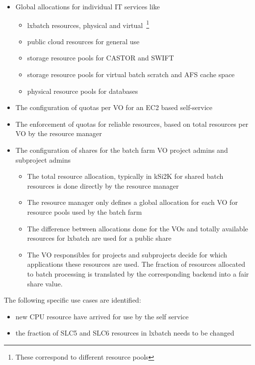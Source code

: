 \begin{itemize}
\item Global allocations for individual IT services like 
\begin{itemize}
\item lxbatch resources, physical and virtual~\footnote{These correspond to different resource pools} 
\item public cloud resources for general use
\item storage resource pools for CASTOR and SWIFT
\item storage resource pools for virtual batch scratch and AFS cache space
\item physical resource pools for databases
\end{itemize}
\item The configuration of quotas per VO for an EC2 based self-service
\item The enforcement of quotas for reliable resources, based on total resources per VO by the resource manager
\item The configuration of shares for the batch farm VO project admins and subproject admins
\begin{itemize}
 \item The total resource allocation, typically in kSi2K for shared batch resources is done directly by the resource manager 
 \item The resource manager only defines a global allocation for each VO for resource pools used by the batch farm
 \item The difference between allocations done for the VOs and totally available resources for lxbatch are used for a public share
 \item The VO responsibles for projects and subprojects decide for which applications these resources are used. The fraction of resources allocated to batch processing is translated by the corresponding backend into a fair share value.
\end{itemize}
\end{itemize}

The following specific use cases are identified:
\begin{itemize}
\item new CPU resource have arrived for use by the self service
\item the fraction of SLC5 and SLC6 resources in lxbatch needs to be changed 

\end{itemize}

